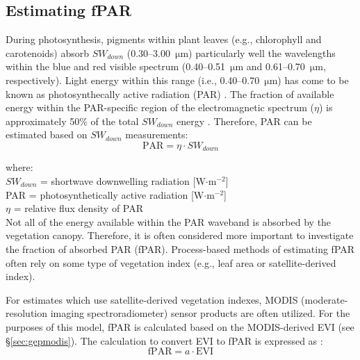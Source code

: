 \subsection{Estimating fPAR}
\label{sec:mst2efpar}
During photosynthesis, pigments within plant leaves (e.g., chlorophyll and carotenoids) absorb $SW_{down}$ (0.30--3.00~$\mathrm{\mu}$m) particularly well the wavelengths within the blue and red visible spectrum (0.40--0.51~$\mathrm{\mu}$m and 0.61--0.70~$\mathrm{\mu}$m, respectively).  
Light energy within this range (i.e., 0.40--0.70~$\mathrm{\mu}$m) has come to be known as photosynthecally active radiation (PAR) \parencite{oke87}.  
The fraction of available energy within the PAR-specific region of the electromagnetic spectrum ($\eta$) is approximately 50\% of the total $SW_{down}$ energy \parencite{stanhill77}.  
Therefore, PAR can be estimated based on $SW_{down}$ measurements:
%
%
\begin{equation}
\label{eq:sw2par}
    \text{PAR} = \eta \cdot SW_{down}
\end{equation}

\noindent where:\\
\indent $SW_{down}$ = shortwave downwelling radiation [W$\cdot$m$^{-2}$]\\
\indent PAR = photosynthetically active radiation [W$\cdot$m$^{-2}$]\\
\indent $\eta$ = relative flux density of PAR\\

\noindent Not all of the energy available within the PAR waveband is absorbed by the vegetation canopy.  
Therefore, it is often considered more important to investigate the fraction of absorbed PAR (fPAR).  
Process-based methods of estimating fPAR often rely on some type of vegetation index (e.g., leaf area or satellite-derived index).  

For estimates which use satellite-derived vegetation indexes, MODIS (moderate-resolution imaging spectroradiometer) sensor products are often utilized.  
For the purposes of this model, fPAR is calculated based on the MODIS-derived EVI (see \S \ref{sec:gepmodis}).  
The calculation to convert EVI to fPAR is expressed as \parencite[Eq. 11]{xiao05}:
%
\begin{equation}
\label{eq:fapar}
    \text{fPAR} = a\cdot \text{EVI}
\end{equation}

